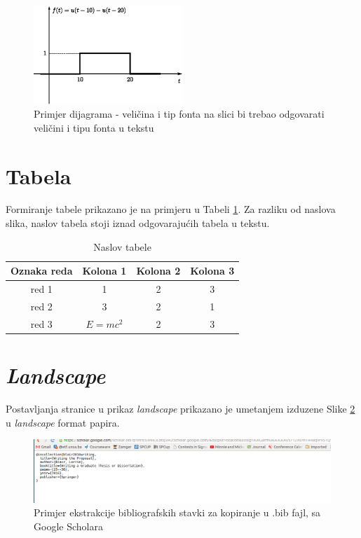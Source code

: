 \begin{figure}
  \centering
  \includegraphics[width=0.5\textwidth]{SlikaCitat3}
  \caption{Primjer dijagrama - veličina i tip fonta na slici bi trebao odgovarati veličini i tipu fonta u tekstu}
  \label{fig:Slika_citat_3}
\end{figure}


\section{Tabela}
Formiranje tabele prikazano je na primjeru u Tabeli \ref{tab:confusion_matrix}. Za razliku od naslova slika, naslov tabela stoji iznad odgovarajućih tabela u tekstu.
\renewcommand{\arraystretch}{1.5} %
\begin{table} [!ht]
  \caption{Naslov tabele}
  \begin{center}
  \begin{tabular}{ | c | c | c | c |}
	\hline
    Oznaka reda & Kolona 1 & Kolona 2 & Kolona 3 \\
    \hline 
    \hline
    red 1 & 1 & 2 & 3 \\ 
    \hline
    red 2 & 3 & 2 & 1 \\ 
     \hline
    red 3 & $E=mc^2$ & 2 & 3 \\ 
     \hline
  \end{tabular}
  \label{tab:confusion_matrix}    
\end{center} 
\end{table}
\renewcommand{\arraystretch}{1} %

\section{\textit{Landscape}}

Postavljanja stranice u prikaz \textit{landscape} prikazano je umetanjem izduzene Slike \ref{fig:Slika_citat2} u \textit{landscape} format papira. 

\begin{landscape}
 \begin{figure}
  \centering
  \includegraphics[width=25cm]{SlikaCitat2}
  \caption{Primjer ekstrakcije bibliografskih stavki za kopiranje u .bib fajl, sa Google Scholara}
  \label{fig:Slika_citat2}
\end{figure}
\end{landscape}

